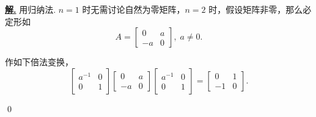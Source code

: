 \documentclass[10pt,openany]{article}
\theoremstyle{thmstyle} %
\theoremstyle{defstyle} %
\theoremstyle{prostyle} %
\theoremstyle{exastyle}
\theoremstyle{remstyle}
\newenvironment{solution}{\par\underline{\textbf{解.}} \;\fangsong}{\qed\par}
\begin{document}
\begin{solution}
	用归纳法. \( n=1 \) 时无需讨论自然为零矩阵，\( n=2 \) 时，假设矩阵非零，那么必定形如
	\[ A=\begin{bmatrix}
		0 & a \\
		-a & 0
	\end{bmatrix}, \; a \neq 0. \]
	
	作如下倍法变换，
	\[ \begin{bmatrix}
		a^{-1} & 0 \\
		0 & 1
	\end{bmatrix}\begin{bmatrix}
	0 & a \\
	-a & 0
	\end{bmatrix}\begin{bmatrix}
	a^{-1} & 0 \\
	0 & 1
	\end{bmatrix}=\begin{bmatrix}
	0 & 1 \\
	-1 & 0
	\end{bmatrix}. \]
	

\end{solution}
\end{document}
